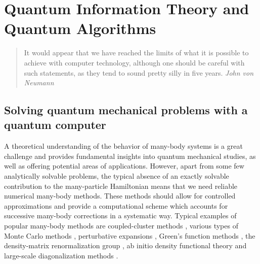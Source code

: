 \chapter{Quantum Information Theory and Quantum Algorithms}\label{chap:quantinfo}

\begin{quotation}
It would appear that we have reached the limits of what it is possible
to achieve with computer technology, although one should be careful
with such statements, as they tend to sound pretty silly in five
years. {\em John von Neumann}
\end{quotation}






\section{Solving quantum mechanical problems with a quantum computer}


A theoretical understanding of the behavior of many-body systems
is a  great challenge and provides fundamental insights into quantum 
mechanical studies, as well
as offering potential areas of applications.
However, apart from some few analytically solvable problems,
the typical absence of an exactly solvable contribution to the
many-particle
 Hamiltonian
means that we need reliable numerical many-body methods.
These methods should allow for controlled approximations
and provide a computational scheme which accounts for successive
many-body corrections in a systematic way.
Typical examples of
popular many-body methods are coupled-cluster methods
\cite{bartlett1981,helgaker,dean2004},
various types of
Monte Carlo methods \cite{Pudliner1997,kdl1997,ceperley1995},
perturbative expansions \cite{lindgren,hko1995},
Green's function methods \cite{dickhoff,blaizot},
the density-matrix renormalization group \cite{white1992,schollwock2005},
ab initio density functional theory
\cite{bartlett2005,peirs2003,vanneck2006}
and large-scale diagonalization methods
\cite{Whitehead1977,caurier2005,navratil2004,horoi2006}. 


